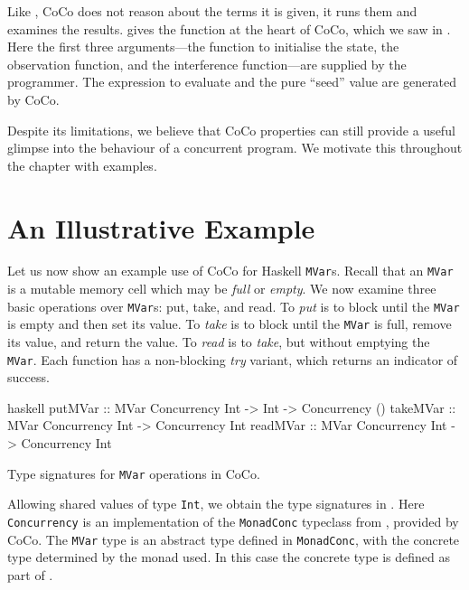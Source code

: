 Like \dejafu{}, CoCo does not reason about the terms it is given, it
runs them and examines the results.  
gives the function at the heart of CoCo, which we saw in
.  Here the first three arguments---the
function to initialise the state, the observation function, and the
interference function---are supplied by the programmer.  The
expression to evaluate and the pure ``seed'' value are generated by
CoCo.

Despite its limitations, we believe that CoCo properties can still
provide a useful glimpse into the behaviour of a concurrent program.
We motivate this throughout the chapter with examples.

\section{An Illustrative Example}
\label{sec:coco-example}

Let us now show an example use of CoCo for Haskell \verb|MVar|s.
Recall that an \verb|MVar| is a mutable memory cell which may be
\emph{full} or \emph{empty}.  We now examine three basic operations
over \verb|MVar|s: put, take, and read.  To \emph{put} is to block
until the \verb|MVar| is empty and then set its value.  To \emph{take}
is to block until the \verb|MVar| is full, remove its value, and
return the value.  To \emph{read} is to \emph{take}, but without
emptying the \verb|MVar|.  Each function has a non-blocking \emph{try}
variant, which returns an indicator of success.

\begin{listing}
\centering
\begin{cminted}{haskell}
putMVar  :: MVar Concurrency Int -> Int -> Concurrency ()
takeMVar :: MVar Concurrency Int -> Concurrency Int
readMVar :: MVar Concurrency Int -> Concurrency Int
\end{cminted}
\caption{Type signatures for \texttt{MVar} operations in CoCo.}\label{lst:mvar_types}
\end{listing}

Allowing shared values of type \verb|Int|, we obtain the type
signatures in .  Here \verb|Concurrency| is an
implementation of the \verb|MonadConc| typeclass from
, provided by CoCo.  The \verb|MVar| type is an
abstract type defined in \verb|MonadConc|, with the concrete type
determined by the monad used.  In this case the concrete type is
defined as part of \dejafu{}.

